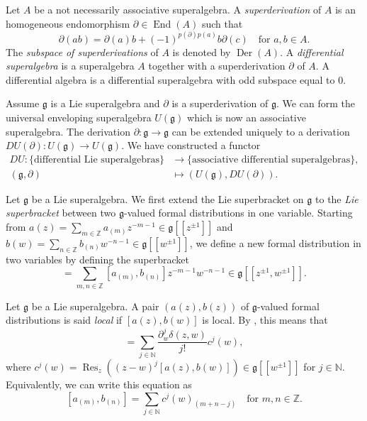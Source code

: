 \documentclass[a4paper, 12pt, reqno]{amsart}
\theoremstyle{remark}
\numberwithin{equation}{subsection}
\DeclareMathOperator{\End}{End}
\DeclareMathOperator{\Res}{Res}
\DeclareMathOperator{\Der}{Der}
\begin{document}
Let $A$ be a not necessarily associative superalgebra.
A \emph{superderivation} of $A$ is an homogeneous endomorphism $\partial \in \End(A)$ such that
\begin{equation*}
  \partial(ab) = \partial(a)b + (-1)^{p(\partial)p(a)}b\partial(c) \quad \text{for }a, b \in A.
\end{equation*}
The \emph{subspace of superderivations} of $A$ is denoted by $\Der(A)$.
A \emph{differential superalgebra} is a superalgebra $A$ together with a superderivation $\partial$ of $A$.
A differential algebra is a differential superalgebra with odd subspace equal to $0$.

Assume $\mathfrak{g}$ is a Lie superalgebra and $\partial$ is a superderivation of $\mathfrak{g}$.
We can form the universal enveloping superalgebra $U(\mathfrak{g})$ which is now an associative superalgebra.
The derivation $\partial: \mathfrak{g} \to \mathfrak{g}$ can be extended uniquely to a derivation $DU(\partial): U(\mathfrak{g}) \to U(\mathfrak{g})$.
We have constructed a functor
\begin{align*}
  DU: \{\text{differential Lie superalgebras}\} &\to \{\text{associative differential superalgebras}\}, \\
  (\mathfrak{g}, \partial) &\mapsto (U(\mathfrak{g}), DU(\partial)).
\end{align*}

Let $\mathfrak{g}$ be a Lie superalgebra.
We first extend the Lie superbracket on $\mathfrak{g}$ to the \emph{Lie superbracket} between two $\mathfrak{g}$-valued formal distributions in one variable.
Starting from $a(z) = \sum_{m \in \mathbb{Z}}a_{(m)}z^{-m - 1} \in \mathfrak{g}[[z^{\pm 1}]]$ and $b(w) = \sum_{n \in \mathbb{Z}}b_{(n)}w^{-n - 1} \in \mathfrak{g}[[w^{\pm 1}]]$, we define a new formal distribution in two variables by defining the superbracket
\begin{equation*}
  [a(z), b(w)] = \sum_{m, n \in \mathbb{Z}}[a_{(m)}, b_{(n)}]z^{-m - 1}w^{-n - 1} \in \mathfrak{g}[[z^{\pm 1}, w^{\pm 1}]].
\end{equation*}

Let $\mathfrak{g}$ be a Lie superalgebra.
A pair $(a(z), b(z))$ of $\mathfrak{g}$-valued formal distributions is said \emph{local} if $[a(z), b(w)]$ is local.
By , this means that
\begin{equation*}
  [a(z), b(w)] = \sum_{j \in \mathbb{N}}\frac{\partial^j_w\delta(z, w)}{j!}c^j(w),
\end{equation*}
where $c^j(w) = \Res_z((z - w)^j[a(z), b(w)]) \in \mathfrak{g}[[w^{\pm 1}]]$ for $j \in \mathbb{N}$.
Equivalently, we can write this equation as
\begin{equation}
  \label{eq:1}
  [a_{(m)}, b_{(n)}] = \sum_{j \in \mathbb{N}}c^j(w)_{(m + n - j)} \quad \text{for }m, n \in \mathbb{Z}.
\end{equation}
\end{document}
